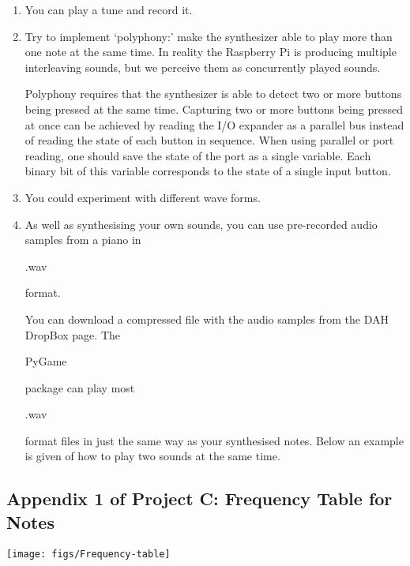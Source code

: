 \begin{enumerate}
\item	You can play a tune and record it.

\item Try to implement `polyphony:' make the synthesizer able to play more than one note at the same time.
In reality the Raspberry Pi is producing multiple interleaving sounds, but we perceive them as concurrently played sounds.

Polyphony requires that the synthesizer is able to detect two or more buttons being pressed at the same time.
Capturing two or more buttons being pressed at once can be achieved by reading the I/O expander as a parallel bus instead of reading the state of each button in sequence.
When using parallel or port reading, one should save the state of the port as a single variable.
Each binary bit of this variable corresponds to the state of a single input button.

\item You could experiment with different wave forms.

\item As well as synthesising your own sounds, you can use pre-recorded audio samples from a piano in \begin{tt}.wav\end{tt} format.

You can download a compressed file with the audio samples from the DAH DropBox page.
The \begin{tt}PyGame\end{tt} package can play most \begin{tt}.wav\end{tt} format files in just the same way as your synthesised notes.
Below an example is given of how to play two sounds at the same time. \\


\vspace*{-0.5cm}
\end{enumerate}



\vfill

\subsection*{Appendix 1 of Project C: Frequency Table for Notes}
\vspace*{-1.0cm}
\begin{center}                                        
 {\texttt{[image: figs/Frequency-table]}}
 \end{center}
 
